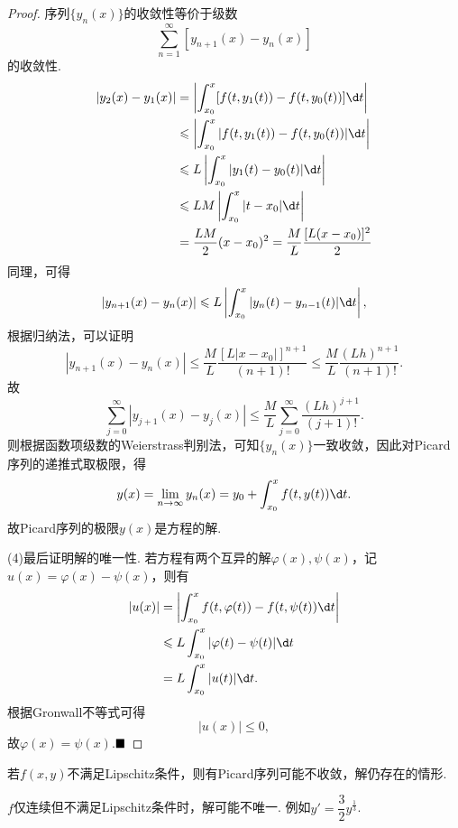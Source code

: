 \documentclass[lang=cn,10pt]{elegantbook}
\begin{document}
\begin{proof}
	序列$\{y_n(x)\}$的收敛性等价于级数
	$$\sum_{n=1}^{\infty}\left[y_{n+1}(x)-y_n(x)\right]$$
	的收敛性. 
	\begin{align*}
		|y_2(x) - y_1(x)| &= \left|\int_{x_0}^{x}[f(t, y_1(t)) - f(t, y_0(t))]\d t\right|\\
		&\leqslant \left|\int_{x_0}^{x}|f(t, y_1(t)) - f(t, y_0(t))|\d t\right|\\
		&\leqslant L\left|\int_{x_0}^{x}|y_1(t) - y_0(t)|\d t\right|\\
		&\leqslant LM\left|\int_{x_0}^{x}|t - x_0|\d t\right|\\
		&= \frac{LM}{2}(x-x_0)^2 = \frac{M}{L}\frac{[L(x-x_0)]^2}{2}
	\end{align*}
	同理，可得
	$$|y_{n+1}(x)-y_n(x)|\leqslant L\left|\int_{x_0}^{x}|y_n(t)-y_{n-1}(t)|\d t\right|,$$
	根据归纳法，可以证明
	$$|y_{n+1}(x)-y_n(x)|\leqslant\frac{M}{L}\frac{\left[L|x-x_0|\right]^{n+1}}{(n+1)!}\leqslant\frac{M}{L}\frac{(Lh)^{n+1}}{(n+1)!}.$$
	故
	$$\sum_{j=0}^{\infty}|y_{j+1}(x)-y_j(x)|\leqslant\frac{M}{L}\sum_{j=0}^{\infty}\frac{(Lh)^{j+1}}{(j+1)!}.$$
	则根据函数项级数的Weierstrass判别法，可知$\{y_n(x)\}$一致收敛，因此对Picard序列的递推式取极限，得
	$$y(x)=\lim\limits_{n\to\infty}y_n(x)=y_0+\int_{x_0}^{x}f(t,y(t))\d t.$$
	故Picard序列的极限$y(x)$是方程的解.
	
	(4)最后证明解的唯一性. 若方程有两个互异的解$\varphi(x), \psi(x)$，记$u(x)=\varphi(x)-\psi(x)$，则有
	\begin{align*}
		|u(x)|&=\left|\int_{x_0}^{x}f(t,\varphi(t))-f(t,\psi(t))\d t\right|\\
		&\leqslant L\int_{x_0}^{x}|\varphi(t)-\psi(t)|\d t\\
		&=L\int_{x_0}^{x}|u(t)|\d t.
	\end{align*}
	根据Gronwall不等式可得
	$$|u(x)|\leqslant 0,$$
	故$\varphi(x)=\psi(x)$.$\hfill\blacksquare$
\end{proof}
\begin{remark}
	若$f(x,y)$不满足Lipschitz条件，则有Picard序列可能不收敛，解仍存在的情形.
\end{remark}
\begin{remark}
	$f$仅连续但不满足Lipschitz条件时，解可能不唯一. 例如$y'=\dfrac{3}{2}y^{\frac{1}{3}}$.
\end{remark}
\hspace*{\fill}
\end{document}
